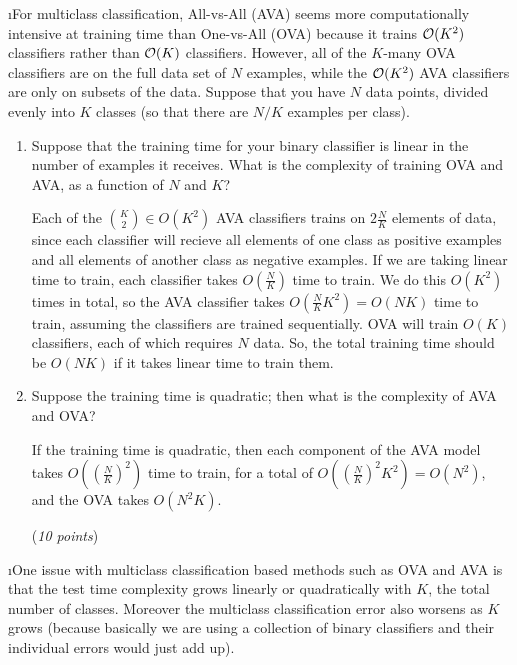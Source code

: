 \documentclass[fleqn]{article}
\begin{document}
\i For multiclass classification, All-vs-All (AVA) seems more computationally 
intensive at training time than One-vs-All (OVA) because it trains $\mathcal{O}(K^2)$ 
classifiers rather than $\mathcal{O}(K)$ classifiers.  However, all of the $K$-many OVA
classifiers are on the full data set of $N$ examples, while the
$\mathcal{O}(K^2)$ AVA classifiers are only on subsets of the data.  Suppose
that you have $N$ data points, divided evenly into $K$ classes (so
that there are $N/K$ examples per class).

\begin{enumerate}
\item Suppose that the training time for your binary classifier is
  linear in the number of examples it receives.  What is the
  complexity of training OVA and AVA, as a function of $N$ and $K$?

\begin{solution}
Each of the ${K \choose 2} \in O(K^2)$ AVA classifiers trains on $2 \frac{N}{K}$ elements of data, since each classifier will recieve all elements of one class as positive examples and all elements of another class as negative examples. If we are taking linear time to train, each classifier takes $O(\frac{N}{K})$ time to train. We do this $O(K^2)$ times in total, so the AVA classifier takes $O(\frac{N}{K}K^2) = O(NK)$ time to train, assuming the classifiers are trained sequentially. OVA will train $O(K)$ classifiers, each of which requires $N$ data. So, the total training time should be $O(NK)$ if it takes linear time to train them.
\end{solution}

\item Suppose the training time is quadratic; then what is the
  complexity of AVA and OVA?


\begin{solution}
If the training time is quadratic, then each component of the AVA model takes $O((\frac{N}{K})^2)$ time to train, for a total of $O((\frac{N}{K})^2 K^2) = O(N^2)$, and the OVA takes $O(N^2K)$.
\end{solution}

 (\emph{10 points})

\end{enumerate}

\i One issue with multiclass classification based methods such as OVA
and AVA is that the test time complexity grows 
linearly or quadratically with $K$, the total number of classes. Moreover
the multiclass classification error also worsens as $K$ grows (because
basically we are using a collection of binary classifiers and their individual
errors would just add up). 
\end{document}
